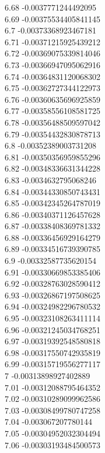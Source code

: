 {6.68	-0.0037771244492095\\
6.69	-0.00375534405841145\\
6.7	-0.00373368923467181\\
6.71	-0.00371215925439212\\
6.72	-0.00369075339814046\\
6.73	-0.00366947095062916\\
6.74	-0.00364831120068302\\
6.75	-0.00362727344122973\\
6.76	-0.00360635696925859\\
6.77	-0.00358556108581725\\
6.78	-0.00356488509597042\\
6.79	-0.00354432830878713\\
6.8	-0.00352389003731208\\
6.81	-0.00350356959855296\\
6.82	-0.00348336631344228\\
6.83	-0.0034632795068246\\
6.84	-0.00344330850743431\\
6.85	-0.00342345264787019\\
6.86	-0.00340371126457628\\
6.87	-0.00338408369781332\\
6.88	-0.00336456929164279\\
6.89	-0.00334516739390785\\
6.9	-0.00332587735620154\\
6.91	-0.00330669853385406\\
6.92	-0.00328763028590412\\
6.93	-0.00326867197508625\\
6.94	-0.00324982296780532\\
6.95	-0.00323108263411114\\
6.96	-0.00321245034768251\\
6.97	-0.00319392548580818\\
6.98	-0.00317550742935819\\
6.99	-0.00315719556277117\\
7	-0.00313898927402889\\
7.01	-0.00312088795464352\\
7.02	-0.00310289099962586\\
7.03	-0.00308499780747258\\
7.04	-0.003067207780144\\
7.05	-0.00304952032304494\\
7.06	-0.00303193484500573\\
}

